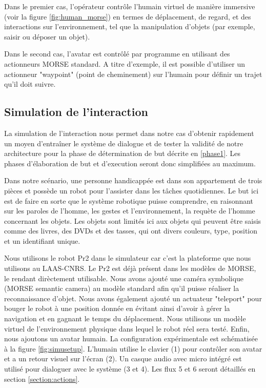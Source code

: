 \documentclass[a4paper,11pt,twoside]{StyleThese}
\begin{document}
Dans le premier cas, l'opérateur contrôle l'humain virtuel de manière immersive (voir la figure \ref{fig:human_morse}) en termes de déplacement, de regard, et des interactions sur l'environnement, tel que la manipulation d'objets (par exemple, saisir ou déposer un objet).

Dans le second cas, l'avatar est contrôlé par programme en utilisant des actionneurs MORSE standard. A titre d'exemple, il est possible d'utiliser un actionneur "waypoint" (point de cheminement) sur l'humain pour définir un trajet qu'il doit suivre.


\subsection{Simulation de l'interaction}

La simulation de l'interaction nous permet dans notre cas d'obtenir rapidement un moyen d'entraîner le système de dialogue et de tester la validité de notre architecture pour la phase de détermination de but décrite en \ref{phase1}.
Les phases d'élaboration de but et d'execution seront donc simplifiées au maximum.

Dans notre scénario, une personne handicappée est dans son appartement de trois pièces et possède un robot pour l'assister dans les tâches quotidiennes.
Le but ici est de faire en sorte que le système robotique puisse comprendre, en raisonnant sur les paroles de l'homme, les gestes et l'environnement, la requète de l'homme concernant les objets. Les objets sont limités ici aux objets qui peuvent être saisis comme des livres, des DVDs et des tasses, qui ont divers couleurs, type, position et un identifiant unique.

Nous utilisons le robot Pr2 dans le simulateur car c'est la plateforme que nous utilisons au LAAS-CNRS. Le Pr2 est déjà présent dans les modèles de MORSE, le rendant dirèctement utilisable. Nous avons ajouté une caméra symbolique (MORSE semantic camera) au modèle standard afin qu'il puisse réaliser la reconnaissance d'objet. Nous avons également ajouté un actuateur "teleport" pour bouger le robot à une position donnée en évitant ainsi d'avoir à gérer la navigation et en gagnant le temps du déplacement. Nous utilisons un modèle virtuel de l'environnement physique dans lequel le robot réel sera testé. Enfin, nous ajoutons un avatar humain. La configuration expérimentale est schématisée à la figure \ref{fig:simusetup}. L'humain utilise le clavier (1) pour contrôler son avatar et a un retour visuel sur l'écran (2). Un casque audio avec micro intégré est utilisé pour dialoguer avec le système (3 et 4). Les flux 5 et 6 seront détaillés en section \ref{section:actions}. 
\end{document}

